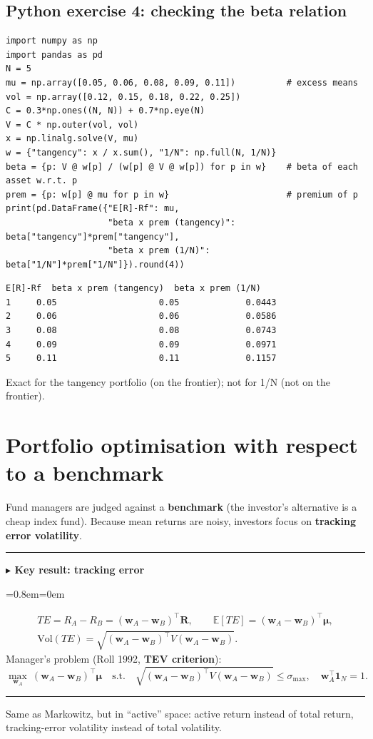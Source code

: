 \documentclass[11pt,a4paper]{report}
\newenvironment{notebox}[1]
  {\par\medskip\Needspace{6\baselineskip}\noindent\rule{\linewidth}{0.4pt}\par\nopagebreak
   \noindent\textbf{#1}\par\nopagebreak
   \begin{list}{}{\leftmargin=0.8em\rightmargin=0em\topsep=2pt}\item[]}
  {\end{list}\nopagebreak\noindent\rule{\linewidth}{0.4pt}\par\medskip}
\newenvironment{keybox}[1][]{\begin{notebox}{$\blacktriangleright$ Key result#1}}{\end{notebox}}
\newcommand{\E}{\mathbb{E}}
\newcommand{\one}{\mathbf{1}_N}
\newcommand{\w}{\bm{w}}
\newcommand{\R}{\bm{R}}
\newcommand{\T}{^{\top}}
\newcommand{\mub}{\bm{\mu}}
\begin{document}
\subsection*{Python exercise 4: checking the beta relation}
\begin{lstlisting}
import numpy as np
import pandas as pd
N = 5
mu = np.array([0.05, 0.06, 0.08, 0.09, 0.11])          # excess means
vol = np.array([0.12, 0.15, 0.18, 0.22, 0.25])
C = 0.3*np.ones((N, N)) + 0.7*np.eye(N)
V = C * np.outer(vol, vol)
x = np.linalg.solve(V, mu)
w = {"tangency": x / x.sum(), "1/N": np.full(N, 1/N)}
beta = {p: V @ w[p] / (w[p] @ V @ w[p]) for p in w}    # beta of each asset w.r.t. p
prem = {p: w[p] @ mu for p in w}                       # premium of p
print(pd.DataFrame({"E[R]-Rf": mu,
                    "beta x prem (tangency)": beta["tangency"]*prem["tangency"],
                    "beta x prem (1/N)": beta["1/N"]*prem["1/N"]}).round(4))
\end{lstlisting}
\begin{lstlisting}[style=out]
   E[R]-Rf  beta x prem (tangency)  beta x prem (1/N)
1     0.05                    0.05             0.0443
2     0.06                    0.06             0.0586
3     0.08                    0.08             0.0743
4     0.09                    0.09             0.0971
5     0.11                    0.11             0.1157
\end{lstlisting}
Exact for the tangency portfolio (on the frontier); not for 1/N (not on the frontier).

\section{Portfolio optimisation with respect to a benchmark}
Fund managers are judged against a \textbf{benchmark} (the investor's
alternative is a cheap index fund). Because mean returns are noisy, investors
focus on \textbf{tracking error volatility}.
\begin{keybox}[: tracking error]
\begin{gather*}
TE=R_A-R_B=(\w_A-\w_B)\T\R,\qquad
\E[TE]=(\w_A-\w_B)\T\mub,\\
\text{Vol}(TE)=\sqrt{(\w_A-\w_B)\T V(\w_A-\w_B)} .
\end{gather*}
Manager's problem (Roll 1992, \textbf{TEV criterion}):
\[
\max_{\w_A}\ (\w_A-\w_B)\T\mub\quad\text{s.t.}\quad\sqrt{(\w_A-\w_B)\T V(\w_A-\w_B)}\le\sigma_{\max},\quad \w_A\T\one=1 .
\]
\end{keybox}
Same as Markowitz, but in ``active'' space: active return instead of total
return, tracking-error volatility instead of total volatility.
\end{document}
